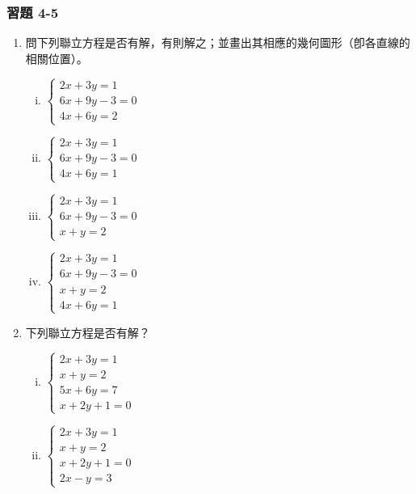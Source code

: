 \subsubsection*{習題 4-5}
\begin{enumerate}
\item 問下列聯立方程是否有解，有則解之；並畫出其相應的幾何圖形（卽各直線的相關位置）。
  \begin{enumerate}[(i)]
    \item $\begin{cases} 2x + 3y = 1 \\ 6x + 9y - 3 = 0 \\ 4x + 6y = 2 \end{cases}$
    \item $\begin{cases} 2x + 3y = 1 \\ 6x + 9y - 3 = 0 \\ 4x + 6y = 1 \end{cases}$
    \item $\begin{cases} 2x + 3y = 1 \\ 6x + 9y - 3 = 0 \\ x + y = 2 \end{cases}$
    \item $\begin{cases} 2x + 3y = 1 \\ 6x + 9y - 3 = 0 \\ x + y = 2 \\ 4x + 6y = 1 \end{cases}$
  \end{enumerate}

\item 下列聯立方程是否有解？
  \begin{enumerate}[(i)]
    \item $\begin{cases} 2x + 3y = 1 \\ x + y = 2 \\ 5x + 6y = 7 \\ x + 2y + 1 = 0 \end{cases}$
    \item $\begin{cases} 2x + 3y = 1 \\ x + y = 2 \\ x + 2y + 1 = 0 \\ 2x - y = 3 \end{cases}$
  \end{enumerate}
\end{enumerate}

